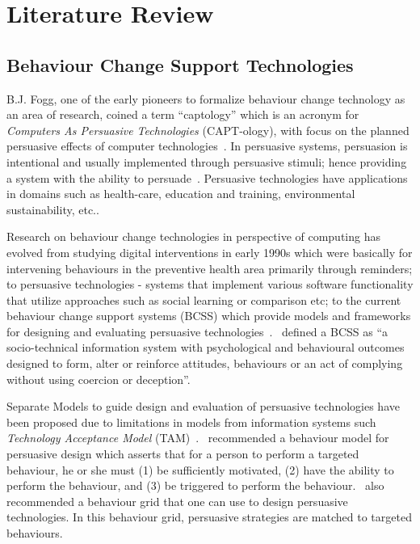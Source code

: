 
\chapter{Literature Review} %

\label{literaturereview} %


\section{Behaviour Change Support Technologies}
B.J. Fogg, one of the early pioneers to formalize behaviour change technology as an area of research, coined a term “captology” which is an acronym for \emph{Computers As Persuasive Technologies} (CAPT-ology), with focus on the planned persuasive effects of computer technologies~\citep{fogg1999persuasive}. In persuasive systems, persuasion is intentional and usually implemented through persuasive stimuli; hence providing a system with the ability to persuade~\citep{hamari2014persuasive}. Persuasive technologies have applications in domains such as health-care, education and training, environmental sustainability, etc..

Research on behaviour change technologies in perspective of computing has evolved from studying digital interventions in early 1990s which were basically for intervening behaviours in the preventive health area primarily through reminders; to persuasive technologies - systems that implement various software functionality that utilize approaches such as social learning or comparison etc; to the current behaviour change support systems (BCSS) which provide models and frameworks for designing and evaluating persuasive technologies~\citep{langrial2012digital}.~\cite{Oinas-Kukkonen:foundation} defined a BCSS  as ``a socio-technical information system with psychological and behavioural outcomes designed to form, alter or reinforce attitudes, behaviours or an act of complying without using coercion or deception''.

Separate Models to guide design and evaluation of persuasive technologies have been proposed due to limitations in models from information systems such \emph{Technology Acceptance Model} (TAM)~\citep{Oinas-kukkonen:psd}.~\cite{fogg2009behavior} recommended a behaviour model for persuasive design which asserts that for a person to perform a targeted behaviour, he or she must (1) be sufficiently motivated, (2) have the ability to perform the behaviour, and (3) be triggered to perform the behaviour.~\cite{fogg2009behavior2} also recommended a behaviour grid that one can use to design persuasive technologies. In this behaviour grid, persuasive strategies are matched to targeted behaviours. 


